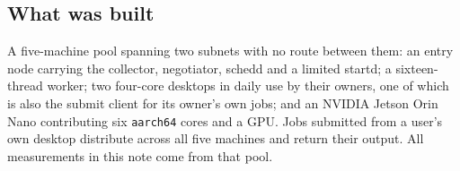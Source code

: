 \subsection{What was built}

A five-machine pool spanning two subnets with no route between them: an entry
node carrying the collector, negotiator, schedd and a limited startd; a
sixteen-thread worker; two four-core desktops in daily use by their owners, one
of which is also the submit client for its owner's own jobs; and an NVIDIA
Jetson Orin Nano contributing six \texttt{aarch64} cores and a GPU. Jobs
submitted from a user's own desktop distribute across all five machines and
return their output. All measurements in this note come from that pool.
